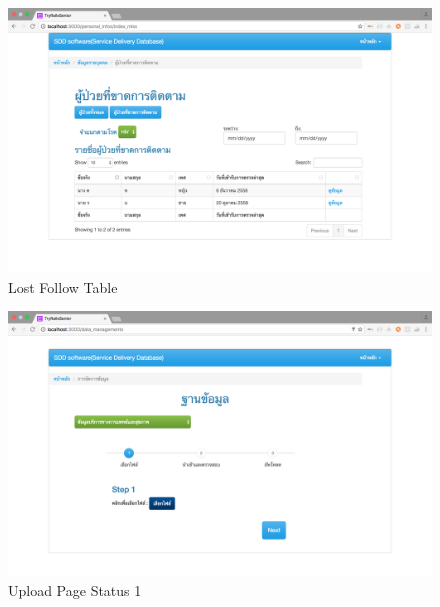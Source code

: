             \FloatBarrier
                \begin{figure}[h!]
                    \centering
                        \includegraphics[width=12cm]{images/chapter-01/mockup_rails/lost_follow_up.png}
                    	\caption{Lost Follow Table}
                    	\label{lost_follow_up}
                \end{figure}
            \FloatBarrier
            
            \FloatBarrier
                \begin{figure}[h!]
                    \centering
                        \includegraphics[width=12cm]{images/chapter-01/mockup_rails/upload.png}
                    	\caption{Upload Page Status 1}
                    	\label{upload}
                \end{figure}
            \FloatBarrier
            
